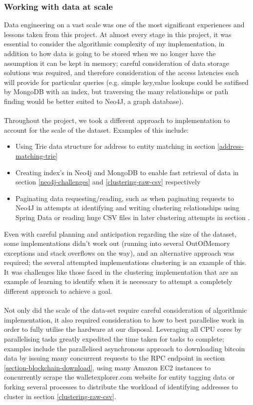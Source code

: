\subsubsection{Working with data at scale}
Data engineering on a vast scale was one of the most significant experiences and lessons taken from this project. At almost every stage in this project, it was essential to consider the algorithmic complexity of my implementation, in addition to how data is going to be stored when we no longer have the assumption it can be kept in memory; careful consideration of data storage solutions was required, and therefore consideration of the access latencies each will provide for particular queries (e.g. simple key,value lookups could be satifised by MongoDB with an index, but traversing the many relationships or path finding would be better suited to Neo4J, a graph database). 
\\\\
Throughout the project, we took a different approach to implementation to account for the scale of the dataset. Examples of this include:
\begin{itemize}
    \item Using Trie data structure for address to entity matching in section \ref{address-matching-trie}
    \item Creating index's in Neo4j and MongoDB to enable fast retrieval of data in section \ref{neo4j-challenges} and \ref{clustering-raw-csv} respectively
    \item Paginating data requesting/reading, such as when paginating requests to Neo4J in attempts at identifying and writing clustering relationships using Spring Data or reading huge CSV files in later clustering attempts in section \label{section-clustering}. 
\end{itemize}

Even with careful planning and anticipation regarding the size of the dataset, some implementations didn't work out (running into several OutOfMemory exceptions and stack overflows on the way), and an alternative approach was required; the several attempted implementations clustering is an example of this. It was challenges like those faced in the clustering implementation that are an example of learning to identify when it is necessary to attempt a completely different approach to achieve a goal. 
\\\\
Not only did the scale of the data-set require careful consideration of algorithmic implementation, it also required consideration to how to best parallelise work in order to fully utilise the hardware at our disposal. 
Leveraging all CPU cores by parallelising tasks greatly expedited the time taken for tasks to complete; examples include the parallelised asynchronous approach to downloading bitcoin data by issuing many concurrent requests to the RPC endpoint in section \ref{section-blockchain-download}, using many Amazon EC2 instances to concurrently scrape the walletexplorer.com website for entity tagging data or forking several processes to distribute the workload of identifying addresses to cluster in section \ref{clustering-raw-csv}.


